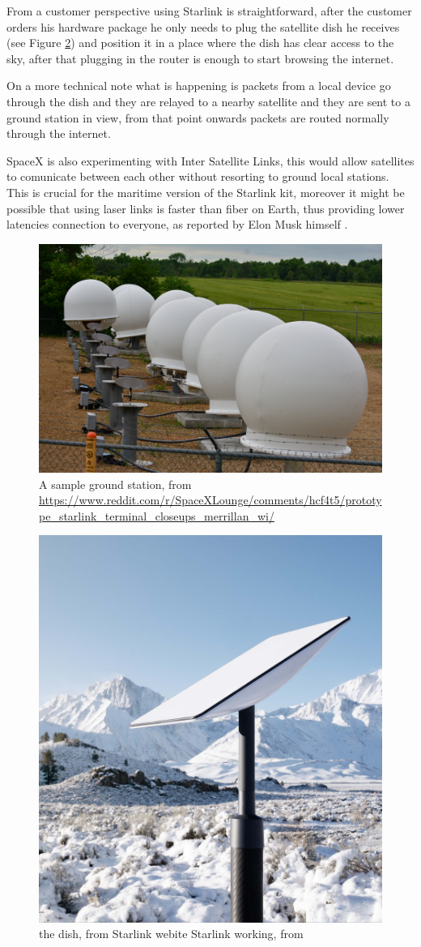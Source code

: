 \documentclass[IN,11pt,twoside,openright,bachelor,english]{tumthesis}
\begin{document}
From a customer perspective using Starlink is straightforward, after the customer orders his hardware package he only needs to plug the satellite dish he receives (see Figure \ref{fig:dish}) and position it in a place where the dish has clear access to the sky, after that plugging in the router is enough to start browsing the internet.

On a more technical note what is happening is packets from a local device go through the dish and they are relayed to a nearby satellite and they are sent to a ground station in view, from that point onwards packets are routed normally through the internet.

SpaceX is also experimenting with Inter Satellite Links, this would allow satellites to comunicate between each other without resorting to ground local stations. This is crucial for the maritime version of the Starlink kit, moreover it might be possible that using laser links is faster than fiber on Earth, thus providing lower latencies connection to everyone, as reported by Elon Musk himself \cite{tweet}.

\begin{figure}
	\label{fig:gs}
	\centering
	\includegraphics[width=0.6\columnwidth]{img/ground-station.jpeg}
	\caption{A sample ground station, from \url{https://www.reddit.com/r/SpaceXLounge/comments/hcf4t5/prototype_starlink_terminal_closeups_merrillan_wi/}}
\end{figure}

\begin{figure}
	\label{fig:dish}
	\centering
	\includegraphics[width=0.6\columnwidth]{img/dish.jpeg}
	\caption{the dish, from Starlink webite Starlink working, from \cite{izhikevich2023democratizing}}
\end{figure}
\end{document}
